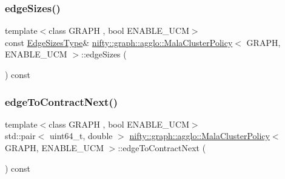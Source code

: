 \subsubsection{\texorpdfstring{edge\+Sizes()}{edgeSizes()}}
{\footnotesize\ttfamily template$<$class G\+R\+A\+PH , bool E\+N\+A\+B\+L\+E\+\_\+\+U\+CM$>$ \\
const \hyperlink{classnifty_1_1graph_1_1agglo_1_1MalaClusterPolicy_a33924545e782bd520270341b21599e7e}{Edge\+Sizes\+Type}\& \hyperlink{classnifty_1_1graph_1_1agglo_1_1MalaClusterPolicy}{nifty\+::graph\+::agglo\+::\+Mala\+Cluster\+Policy}$<$ G\+R\+A\+PH, E\+N\+A\+B\+L\+E\+\_\+\+U\+CM $>$\+::edge\+Sizes (\begin{DoxyParamCaption}{ }\end{DoxyParamCaption}) const\hspace{0.3cm}{\ttfamily [inline]}}

\mbox{\label{classnifty_1_1graph_1_1agglo_1_1MalaClusterPolicy_a8b87f155261b8196cad0e301af5c58dd}} 
\subsubsection{\texorpdfstring{edge\+To\+Contract\+Next()}{edgeToContractNext()}}
{\footnotesize\ttfamily template$<$class G\+R\+A\+PH , bool E\+N\+A\+B\+L\+E\+\_\+\+U\+CM$>$ \\
std\+::pair$<$ uint64\+\_\+t, double $>$ \hyperlink{classnifty_1_1graph_1_1agglo_1_1MalaClusterPolicy}{nifty\+::graph\+::agglo\+::\+Mala\+Cluster\+Policy}$<$ G\+R\+A\+PH, E\+N\+A\+B\+L\+E\+\_\+\+U\+CM $>$\+::edge\+To\+Contract\+Next (\begin{DoxyParamCaption}{ }\end{DoxyParamCaption}) const\hspace{0.3cm}{\ttfamily [inline]}}

\mbox{\label{classnifty_1_1graph_1_1agglo_1_1MalaClusterPolicy_acc2efcd70451970202efabf07777007d}} 
